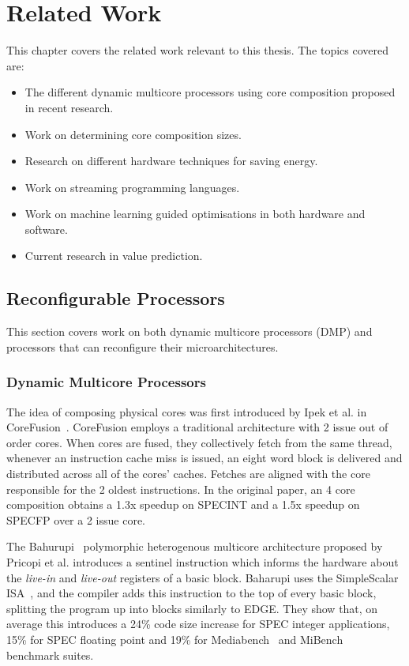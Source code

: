 \chapter{Related Work}
This chapter covers the related work relevant to this thesis.
The topics covered are:
\begin{itemize}
\item The different dynamic multicore processors using core composition proposed in recent research.
\vspace{-1em}
\item Work on determining core composition sizes.
\vspace{-1em}
\item Research on different hardware techniques for saving energy.
\vspace{-1em}
\item Work on streaming programming languages.
\vspace{-1em}
\item Work on machine learning guided optimisations in both hardware and software.
\vspace{-1em}
\item Current research in value prediction.
\end{itemize}

\section{Reconfigurable Processors}

This section covers work on both dynamic multicore processors (DMP) and processors that can reconfigure their microarchitectures.

\subsection{Dynamic Multicore Processors}
The idea of composing physical cores was first introduced by Ipek et al. in CoreFusion~\cite{ipek2007CoreFusion}.
CoreFusion employs a traditional architecture with 2 issue out of order cores.
When cores are fused, they collectively fetch from the same thread, whenever an instruction cache miss is issued, an eight word block is delivered and distributed across all of the cores' caches.
Fetches are aligned with the core responsible for the 2 oldest instructions.
In the original paper, an 4 core composition obtains a 1.3x speedup on SPECINT and a 1.5x speedup on SPECFP over a 2 issue core.
 
The Bahurupi~\cite{pricopi2012bahurupi} polymorphic heterogenous multicore architecture proposed by Pricopi et al. introduces a sentinel instruction which informs the hardware about the \textit{live-in} and \textit{live-out} registers of a basic block.
Baharupi uses the SimpleScalar ISA~\cite{burger1997simplescalar}, and the compiler adds this instruction to the top of every basic block, splitting the program up into blocks similarly to EDGE.
They show that, on average this introduces a 24\% code size increase for SPEC integer applications, 15\% for SPEC floating point and 19\% for Mediabench~\cite{mediabench} and MiBench~\cite{mibench} benchmark suites.

